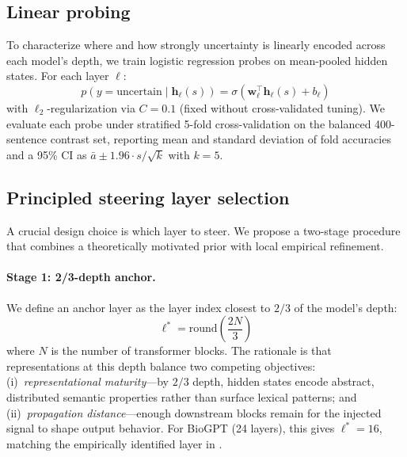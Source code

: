 \documentclass[11pt,a4paper]{article}
\begin{document}
\subsection{Linear probing}

To characterize where and how strongly uncertainty is linearly encoded
across each model's depth, we train logistic regression probes on
mean-pooled hidden states. For each layer $\ell$:
\begin{equation}
p(y = \text{uncertain} \mid \mathbf{h}_\ell(s)) =
\sigma\!\left(\mathbf{w}_\ell^\top \mathbf{h}_\ell(s) + b_\ell\right)
\label{eq:probe}
\end{equation}
with $\ell_2$-regularization via $C = 0.1$ (fixed without
cross-validated tuning). We evaluate each probe under stratified 5-fold
cross-validation on the balanced 400-sentence contrast set, reporting
mean and standard deviation of fold accuracies and a 95\% CI as
$\bar{a} \pm 1.96 \cdot s/\sqrt{k}$ with $k=5$.

\subsection{Principled steering layer selection}
\label{sec:layerselect}

A crucial design choice is which layer to steer. We propose a two-stage
procedure that combines a theoretically motivated prior with local
empirical refinement.

\paragraph{Stage 1: 2/3-depth anchor.}
We define an anchor layer as the layer index closest to $2/3$ of the
model's depth:
\begin{equation}
\ell^* = \mathrm{round}\!\left(\frac{2N}{3}\right)
\label{eq:anchor}
\end{equation}
where $N$ is the number of transformer blocks. The rationale is that
representations at this depth balance two competing objectives:
(i)~\emph{representational maturity}---by $2/3$ depth, hidden states
encode abstract, distributed semantic properties rather than surface
lexical patterns; and (ii)~\emph{propagation distance}---enough
downstream blocks remain for the injected signal to shape output
behavior. For BioGPT (24 layers), this gives $\ell^* = 16$, matching
the empirically identified layer in \citet{luo2022biogpt}.
\end{document}

